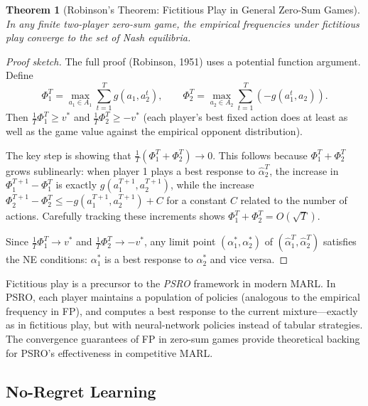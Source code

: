 \documentclass[11pt,a4paper]{article}
\theoremstyle{definition}
\theoremstyle{plain}
\newtheorem{theorem}{Theorem}[section]
\theoremstyle{remark}
\begin{document}
\begin{theorem}[Robinson's Theorem: Fictitious Play in General Zero-Sum Games]
\label{thm:robinson}
In any finite two-player zero-sum game, the empirical frequencies under fictitious play
converge to the set of Nash equilibria.
\end{theorem}

\begin{proof}[Proof sketch]
The full proof (Robinson, 1951) uses a potential function argument. Define
\[
    \Phi_1^T = \max_{a_1 \in A_1} \sum_{t=1}^T g(a_1, a_2^t), \qquad
    \Phi_2^T = \max_{a_2 \in A_2} \sum_{t=1}^T (-g(a_1^t, a_2)).
\]
Then $\frac{1}{T}\Phi_1^T \geq v^*$ and $\frac{1}{T}\Phi_2^T \geq -v^*$ (each player's
best fixed action does at least as well as the game value against the empirical opponent
distribution).

The key step is showing that $\frac{1}{T}(\Phi_1^T + \Phi_2^T) \to 0$. This follows
because $\Phi_1^T + \Phi_2^T$ grows sublinearly: when player 1 plays a best response to
$\hat{\alpha}_2^T$, the increase in $\Phi_1^{T+1} - \Phi_1^T$ is exactly
$g(a_1^{T+1}, a_2^{T+1})$, while the increase $\Phi_2^{T+1} - \Phi_2^T \leq
-g(a_1^{T+1}, a_2^{T+1}) + C$ for a constant $C$ related to the number of actions.
Carefully tracking these increments shows $\Phi_1^T + \Phi_2^T = O(\sqrt{T})$.

Since $\frac{1}{T}\Phi_1^T \to v^*$ and $\frac{1}{T}\Phi_2^T \to -v^*$, any limit point
$(\alpha_1^*, \alpha_2^*)$ of $(\hat{\alpha}_1^T, \hat{\alpha}_2^T)$ satisfies the NE
conditions: $\alpha_1^*$ is a best response to $\alpha_2^*$ and vice versa.
\end{proof}

\begin{rlconnection}
Fictitious play is a precursor to the \emph{PSRO} framework in modern MARL. In PSRO,
each player maintains a population of policies (analogous to the empirical frequency in FP),
and computes a best response to the current mixture---exactly as in fictitious play, but
with neural-network policies instead of tabular strategies. The convergence guarantees of
FP in zero-sum games provide theoretical backing for PSRO's effectiveness in competitive
MARL.
\end{rlconnection}

\subsection{No-Regret Learning}
\end{document}
